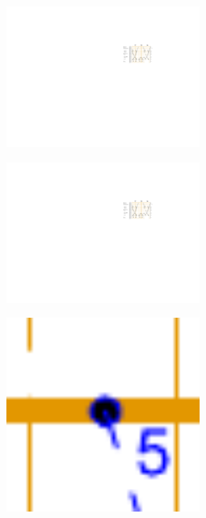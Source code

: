 \begin{figure}[ht]
    \centering
    \begin{subfigure}[b]{0.24\textwidth}
        \includegraphics[width=0.7\textwidth]{../img/koty_dalsi_set_y}
        \caption{}
        \label{fig:kap6:szdc_koty_y}
    \end{subfigure}
    \begin{subfigure}[b]{0.24\textwidth}
        \includegraphics[width=0.7\textwidth]{../img/koty_dalsi_set_z}
        \label{fig:kap6:szdc_koty_z}
        \caption{}
    \end{subfigure}
	\begin{subfigure}[b]{0.24\textwidth}
        \includegraphics[width=0.7\textwidth]{../img/koty_dalsi_set_a}

\end{subfigure}
\end{figure}
